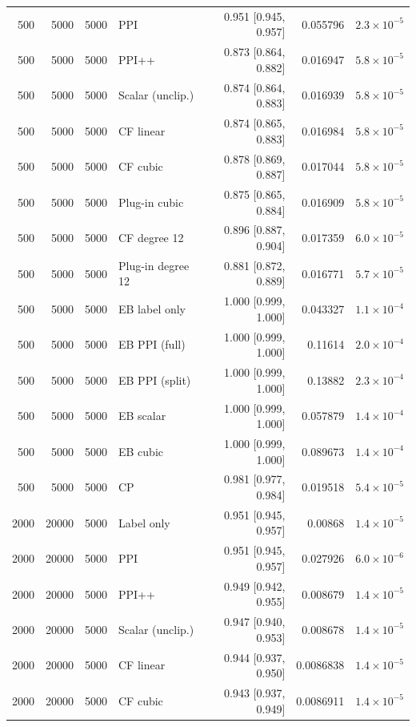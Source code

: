 {\begin{longtable}{rrrlrrr}
500 & 5000 & 5000 & PPI & 0.951 [0.945, 0.957] & 0.055796 & $2.3\times 10^{-5}$ \\
500 & 5000 & 5000 & PPI++ & 0.873 [0.864, 0.882] & 0.016947 & $5.8\times 10^{-5}$ \\
500 & 5000 & 5000 & Scalar (unclip.) & 0.874 [0.864, 0.883] & 0.016939 & $5.8\times 10^{-5}$ \\
500 & 5000 & 5000 & CF linear & 0.874 [0.865, 0.883] & 0.016984 & $5.8\times 10^{-5}$ \\
500 & 5000 & 5000 & CF cubic & 0.878 [0.869, 0.887] & 0.017044 & $5.8\times 10^{-5}$ \\
500 & 5000 & 5000 & Plug-in cubic & 0.875 [0.865, 0.884] & 0.016909 & $5.8\times 10^{-5}$ \\
500 & 5000 & 5000 & CF degree 12 & 0.896 [0.887, 0.904] & 0.017359 & $6.0\times 10^{-5}$ \\
500 & 5000 & 5000 & Plug-in degree 12 & 0.881 [0.872, 0.889] & 0.016771 & $5.7\times 10^{-5}$ \\
500 & 5000 & 5000 & EB label only & 1.000 [0.999, 1.000] & 0.043327 & $1.1\times 10^{-4}$ \\
500 & 5000 & 5000 & EB PPI (full) & 1.000 [0.999, 1.000] & 0.11614 & $2.0\times 10^{-4}$ \\
500 & 5000 & 5000 & EB PPI (split) & 1.000 [0.999, 1.000] & 0.13882 & $2.3\times 10^{-4}$ \\
500 & 5000 & 5000 & EB scalar & 1.000 [0.999, 1.000] & 0.057879 & $1.4\times 10^{-4}$ \\
500 & 5000 & 5000 & EB cubic & 1.000 [0.999, 1.000] & 0.089673 & $1.4\times 10^{-4}$ \\
500 & 5000 & 5000 & CP & 0.981 [0.977, 0.984] & 0.019518 & $5.4\times 10^{-5}$ \\
2000 & 20000 & 5000 & Label only & 0.951 [0.945, 0.957] & 0.00868 & $1.4\times 10^{-5}$ \\
2000 & 20000 & 5000 & PPI & 0.951 [0.945, 0.957] & 0.027926 & $6.0\times 10^{-6}$ \\
2000 & 20000 & 5000 & PPI++ & 0.949 [0.942, 0.955] & 0.008679 & $1.4\times 10^{-5}$ \\
2000 & 20000 & 5000 & Scalar (unclip.) & 0.947 [0.940, 0.953] & 0.008678 & $1.4\times 10^{-5}$ \\
2000 & 20000 & 5000 & CF linear & 0.944 [0.937, 0.950] & 0.0086838 & $1.4\times 10^{-5}$ \\
2000 & 20000 & 5000 & CF cubic & 0.943 [0.937, 0.949] & 0.0086911 & $1.4\times 10^{-5}$ \\

\end{longtable}}
